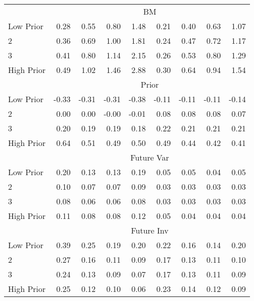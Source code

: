 \begin{table}[!ht]
\begin{tabular}{lrrrrrrrr}
  
    & \multicolumn{8}{c}{BM}  \\
     \cmidrule(r){2-5} \cmidrule(r){6-9}
    Low Prior  & 0.28  & 0.55  & 0.80  & 1.48  & 0.21  & 0.40  & 0.63  & 1.07   \\
    2  & 0.36  & 0.69  & 1.00  & 1.81  & 0.24  & 0.47  & 0.72  & 1.17   \\
    3  & 0.41  & 0.80  & 1.14  & 2.15  & 0.26  & 0.53  & 0.80  & 1.29   \\
    High Prior  & 0.49  & 1.02  & 1.46  & 2.88  & 0.30  & 0.64  & 0.94  & 1.54   \\
    
  
    & \multicolumn{8}{c}{Prior}  \\
     \cmidrule(r){2-5} \cmidrule(r){6-9}
    Low Prior  & -0.33  & -0.31  & -0.31  & -0.38  & -0.11  & -0.11  & -0.11  & -0.14   \\
    2  & 0.00  & 0.00  & -0.00  & -0.01  & 0.08  & 0.08  & 0.08  & 0.07   \\
    3  & 0.20  & 0.19  & 0.19  & 0.18  & 0.22  & 0.21  & 0.21  & 0.21   \\
    High Prior  & 0.64  & 0.51  & 0.49  & 0.50  & 0.49  & 0.44  & 0.42  & 0.41   \\
    
  

    & \multicolumn{8}{c}{Future Var}  \\
     \cmidrule(r){2-5} \cmidrule(r){6-9}
    Low Prior  & 0.20  & 0.13  & 0.13  & 0.19  & 0.05  & 0.05  & 0.04  & 0.05   \\
    2  & 0.10  & 0.07  & 0.07  & 0.09  & 0.03  & 0.03  & 0.03  & 0.03   \\
    3  & 0.08  & 0.06  & 0.06  & 0.08  & 0.03  & 0.03  & 0.03  & 0.03   \\
    High Prior  & 0.11  & 0.08  & 0.08  & 0.12  & 0.05  & 0.04  & 0.04  & 0.04   \\
  
    & \multicolumn{8}{c}{Future Inv}  \\
     \cmidrule(r){2-5} \cmidrule(r){6-9}
    Low Prior  & 0.39  & 0.25  & 0.19  & 0.20  & 0.22  & 0.16  & 0.14  & 0.20   \\
    2  & 0.27  & 0.16  & 0.11  & 0.09  & 0.17  & 0.13  & 0.11  & 0.10   \\
    3  & 0.24  & 0.13  & 0.09  & 0.07  & 0.17  & 0.13  & 0.11  & 0.09   \\
    High Prior  & 0.25  & 0.12  & 0.10  & 0.06  & 0.23  & 0.14  & 0.12  & 0.09   \\
    

\end{tabular}
\end{table}
